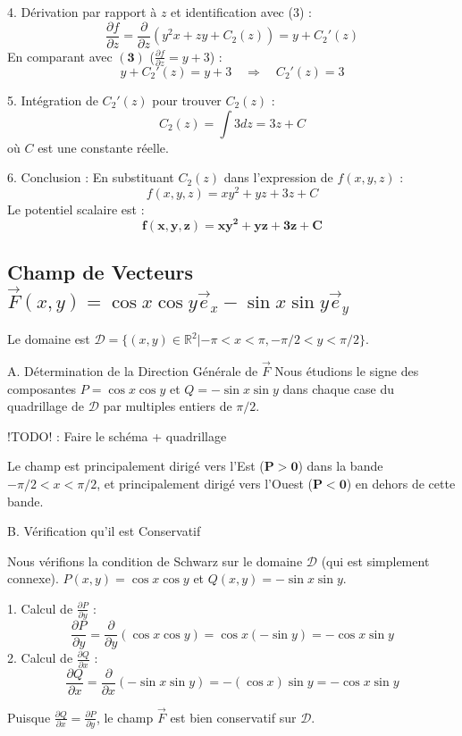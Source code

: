 \documentclass[french]{yLectureNote}
\renewcommand{\vec}{\overrightarrow}
\begin{document}
4.  Dérivation par rapport à $z$ et identification avec (3) :
    $$
    \frac{\partial f}{\partial z} = \frac{\partial}{\partial z}(y^2x + zy + C_2(z)) = y + C_2'(z)
    $$
    En comparant avec $\mathbf{(3)}$ ($\frac{\partial f}{\partial z} = y+3$) :
    $$
    y + C_2'(z) = y + 3 \quad \Rightarrow \quad C_2'(z) = 3
    $$

5.  Intégration de $C_2'(z)$ pour trouver $C_2(z)$ :
    $$
    C_2(z) = \int 3 dz = 3z + C
    $$
    où $C$ est une constante réelle.

6.  Conclusion :
    En substituant $C_2(z)$ dans l'expression de $f(x,y,z)$ :
    $$
    f(x,y,z) = xy^2 + yz + 3z + C
    $$
    Le potentiel scalaire est :
    $$
    \mathbf{f(x,y,z) = xy^2 + yz + 3z + C}
    $$

\subsection{Champ de Vecteurs $\vec{F}(x,y)=\cos x \cos y \vec{e}_{x}-\sin x \sin y \vec{e}_{y}$}

Le domaine est $\mathcal{D}=\{(x,y)\in\mathbb{R}^{2}|-\pi<x<\pi, -\pi/2<y<\pi/2\}$.

 A. Détermination de la Direction Générale de $\vec{F}$
Nous étudions le signe des composantes $P = \cos x \cos y$ et $Q = -\sin x \sin y$ dans chaque case du quadrillage de $\mathcal{D}$ par multiples entiers de $\pi/2$.

!TODO! : Faire le schéma + quadrillage

Le champ est principalement dirigé vers l'Est ($\mathbf{P>0}$) dans la bande $-\pi/2 < x < \pi/2$, et principalement dirigé vers l'Ouest ($\mathbf{P<0}$) en dehors de cette bande.

B. Vérification qu'il est Conservatif

Nous vérifions la condition de Schwarz sur le domaine $\mathcal{D}$ (qui est simplement connexe).
$P(x,y) = \cos x \cos y$ et $Q(x,y) = -\sin x \sin y$.

1.  Calcul de $\frac{\partial P}{\partial y}$ :
    $$
    \frac{\partial P}{\partial y} = \frac{\partial}{\partial y}(\cos x \cos y) = \cos x (-\sin y) = -\cos x \sin y
    $$
2.  Calcul de $\frac{\partial Q}{\partial x}$ :
    $$
    \frac{\partial Q}{\partial x} = \frac{\partial}{\partial x}(-\sin x \sin y) = -(\cos x) \sin y = -\cos x \sin y
    $$

Puisque $\frac{\partial Q}{\partial x} = \frac{\partial P}{\partial y}$, le champ $\vec{F}$ est bien conservatif sur $\mathcal{D}$.
\end{document}
